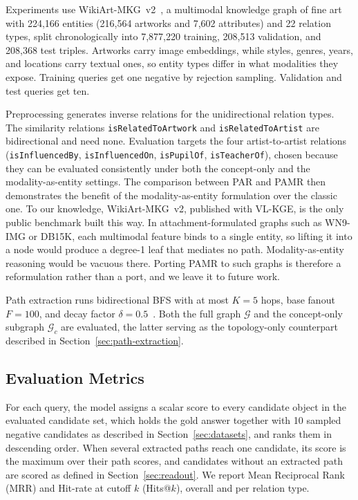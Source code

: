 \documentclass[runningheads]{llncs}
\begin{document}
Experiments use WikiArt-MKG~v2~\cite{efthymiou2026vlkge}, a multimodal
knowledge graph of fine art with 224,166 entities (216,564 artworks and
7,602 attributes) and 22 relation types, split chronologically into
7,877,220 training, 208,513 validation, and 208,368 test triples.
Artworks carry image embeddings, while styles, genres, years, and locations
carry textual ones, so entity types differ in what modalities they
expose. Training queries get one negative by rejection sampling.
Validation and test queries get ten.

Preprocessing generates inverse
relations for the unidirectional relation types. The similarity
relations \texttt{isRelatedToArtwork} and \texttt{isRelatedToArtist} are
bidirectional and need none. Evaluation targets the four artist-to-artist
relations (\texttt{isInfluencedBy},
\texttt{isInfluencedOn}, \texttt{isPupilOf}, \texttt{isTeacherOf}),
chosen because they can be evaluated consistently under both the
concept-only and the modality-as-entity settings. The comparison
between PAR and PAMR then demonstrates the benefit of the
modality-as-entity formulation over the classic one. To our knowledge, WikiArt-MKG~v2,
published with VL-KGE, is the only public benchmark built this way. In
attachment-formulated graphs such as WN9-IMG or DB15K, each multimodal
feature binds to a single entity, so lifting it into a node would
produce a degree-1 leaf that mediates no path. Modality-as-entity
reasoning would be vacuous there. Porting PAMR to such graphs is
therefore a reformulation rather than a port, and we leave it to
future work.

Path extraction runs bidirectional BFS with at most $K = 5$ hops, base
fanout $F = 100$, and decay factor $\delta = 0.5$~\cite{icaart26}. Both
the full graph $\mathcal{G}$ and the concept-only subgraph $\mathcal{G}_c$
are evaluated, the latter serving as the topology-only
counterpart described in Section~\ref{sec:path-extraction}.

\subsection{Evaluation Metrics}
\label{sec:evaluation-metrics}

For each query, the model assigns a scalar score to every candidate
object in the evaluated candidate set, which holds the gold answer
together with 10 sampled negative candidates as described in
Section~\ref{sec:datasets}, and ranks them in descending order. When
several extracted paths reach one candidate, its score is the maximum
over their path scores, and candidates without an extracted path are
scored as defined in Section~\ref{sec:readout}. We
report Mean Reciprocal Rank (MRR) and Hit-rate at cutoff $k$
(Hits@$k$), overall and per relation type.
\end{document}
